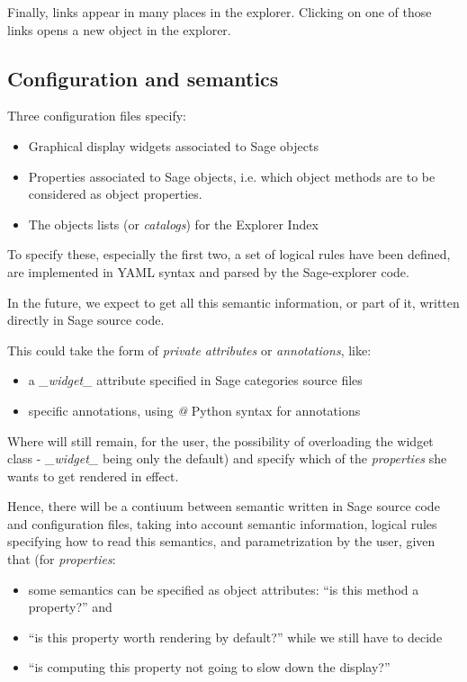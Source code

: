 \documentclass{deliverablereport}
\begin{document}
Finally, links appear in many places in the explorer. Clicking on one
of those links opens a new object in the explorer.

\subsection{Configuration and semantics}
\label{semantics}

Three configuration files specify:

\begin{itemize}
\item Graphical display widgets associated to Sage objects
  \item Properties associated to Sage objects, i.e. which object methods are
    to be considered as object properties.
\item The objects lists (or \emph{catalogs}) for the Explorer Index
\end{itemize}

To specify these, especially the first two, a set of logical rules
have been defined, are implemented in YAML syntax and parsed by the
Sage-explorer code.

In the future, we expect to get all this semantic information, or part of it,
written directly in Sage source code.

This could take the form of \emph{private attributes} or \emph{annotations}, like:

\begin{itemize}
\item a \emph{\_widget\_} attribute specified in Sage categories source files
\item specific annotations, using \emph{@} Python syntax for annotations
  \end{itemize}

Where will still remain, for the user, the possibility of overloading
the widget class - \emph{\_widget\_} being only the default) and
specify which of the \emph{properties} she wants to get rendered in effect.

Hence, there will be a contiuum between semantic written in Sage
source code and configuration files, taking into account semantic
information, logical rules specifying how to read this semantics, and
parametrization by the user, given that (for \emph{properties}:

\begin{itemize}
\item some semantics can be specified as object attributes: ``is this method a
  property?'' and
  \item ``is this property worth rendering by default?''  while we
    still have to decide
  \item ``is computing this property not going to slow down the display?''
\end{itemize}
\end{document}
